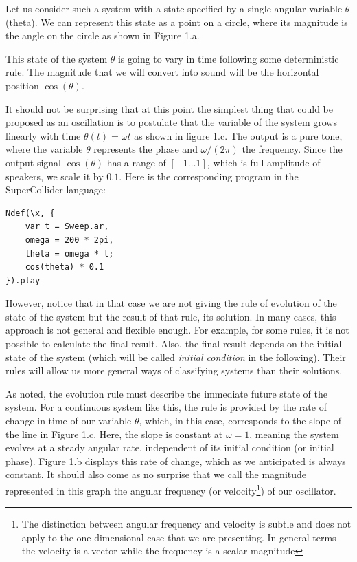 \documentclass{article}
\begin{document}
Let us consider such a system with a state specified by a single angular variable $\theta$ (theta). 
We can represent this state as a point on a circle, where its magnitude is the angle on the circle as shown in Figure 1.a.

This state of the system $\theta$ is going to vary in time following some deterministic rule. The magnitude that we will convert into sound will be the horizontal position $\cos(\theta)$.

It should not be surprising that at this point the simplest thing that could be proposed as an oscillation is to postulate that the variable of the system grows linearly with time $\theta(t)=\omega t$ as shown in figure 1.c.  The output is a pure tone, where the variable $\theta$ represents the phase and $\omega/(2\pi)$ the frequency. Since the output signal $\cos(\theta)$ has a range of $[-1…1]$, which is full amplitude of speakers, we scale it by $0.1$. Here is the corresponding program in the SuperCollider language:


\begin{lstlisting}[frame=single,caption=A pure tone from time $t$]
Ndef(\x, { 
    var t = Sweep.ar, 
    omega = 200 * 2pi, 
    theta = omega * t; 
    cos(theta) * 0.1 
}).play
\end{lstlisting}

    
However, notice that in that case we are not giving the rule of evolution of the state of the system but the result of that rule, its solution. 
In many cases, this approach is not general and flexible enough. 
For example, for some rules, it is not possible to calculate the final result. 
Also, the final result depends on the initial state of the system (which will be called {\em initial condition} in the following). Their rules will allow us more general ways of classifying systems than their solutions.

As noted, the evolution rule must describe the immediate future state of the system. 
For a continuous system like this, the rule is provided by the rate of change in time of our variable $\theta$, which, in this case, corresponds to the slope of the line in Figure 1.c. 
Here, the slope is constant at $\omega=1$, meaning the system evolves at a steady angular rate, independent of its initial condition (or initial phase). Figure 1.b displays this rate of change, which as we anticipated is always constant. 
It should also come as no surprise that we call the magnitude represented in this graph the angular frequency (or velocity\footnote{The distinction between angular frequency and velocity is subtle and does not apply to the one dimensional case that we are presenting. In general terms the velocity is a vector while the frequency is a scalar magnitude}) of our oscillator.
\end{document}
